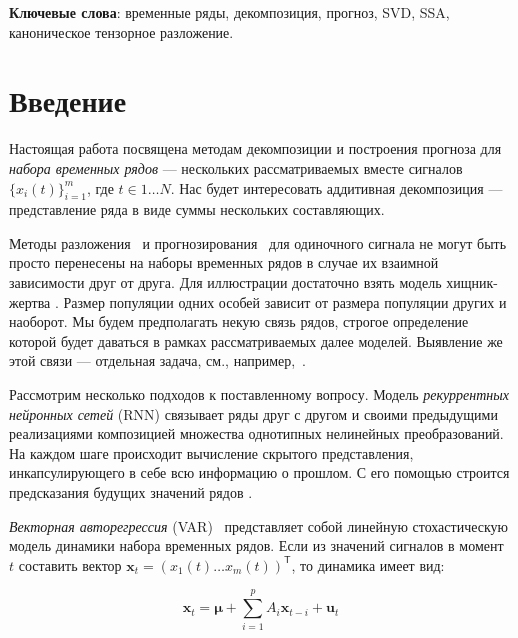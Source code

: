 	\textbf{Ключевые слова}: {\small временные ряды, декомпозиция, прогноз, SVD, SSA, каноническое тензорное разложение}.
	
	
	\section{Введение}\label{Intro}
	
		Настоящая работа посвящена методам декомпозиции и построения прогноза для \textit{набора временных рядов} --- нескольких рассматриваемых вместе сигналов $ \{x_i(t)\}_{i=1}^m $, где $ t \in 1 \ldots N $. Нас будет интересовать аддитивная декомпозиция --- представление ряда в виде суммы нескольких составляющих.
		
		Методы разложения~\cite{enders2010applied, x11, cleveland90} и прогнозирования~\cite{3b1355aedd1041f1853e609a410576f3, enders2010applied, Box_Jenkins_methodology} для одиночного сигнала не могут быть просто перенесены на наборы временных рядов в случае их взаимной зависимости друг от друга. Для иллюстрации достаточно взять модель хищник-жертва \cite{Volterra:1928}. Размер популяции одних особей зависит от размера популяции других и наоборот. Мы будем предполагать некую связь рядов, строгое определение которой будет даваться в рамках рассматриваемых далее моделей. Выявление же этой связи --- отдельная задача, см., например,~\cite{702ab909-8cb1-3c30-a5f1-ab4517d6cf1c, 2012Sci...338..496S}.
		
		Рассмотрим несколько подходов к поставленному вопросу. Модель \textit{рекуррентных нейронных сетей} (RNN) \cite{neco, TEALAB2018334} связывает ряды друг с другом и своими предыдущими реализациями композицией множества однотипных нелинейных преобразований. На каждом шаге происходит вычисление скрытого представления, инкапсулирующего в себе всю информацию о прошлом. С его помощью строится предсказания будущих значений рядов \cite{ZHANG2023143, HEWAMALAGE2021388}. 
		
		\textit{Векторная авторегрессия} (VAR)~\cite{VAR_model1, doi:10.1080/01621459.1962.10480664} представляет собой линейную стохастическую модель динамики набора временных рядов. Если из значений сигналов в момент $ t $ составить вектор $ \mathbf{x}_t = (x_1(t) \ldots x_m(t))^{\mathsf{T}} $, то динамика имеет вид:
		
		\begin{equation*}
			\mathbf{x}_t = \boldsymbol{\mu} + \sum\limits_{i = 1}^p A_i \mathbf{x}_{t - i} + \mathbf{u}_t
		\end{equation*}
		
